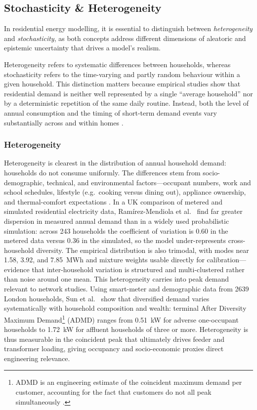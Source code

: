 \subsection{Stochasticity \& Heterogeneity}\label{sec:stochastic_hetero}
In residential energy modelling, it is essential to distinguish between \textit{heterogeneity} and \textit{stochasticity}, as both concepts address different dimensions of aleatoric and epistemic uncertainty that drives a model's realism. 

Heterogeneity refers to systematic differences between households, whereas stochasticity refers to the time-varying and partly random behaviour within a given household. This distinction matters because empirical studies show that residential demand is neither well represented by a single “average household” nor by a deterministic repetition of the same daily routine. Instead, both the level of annual consumption and the timing of short-term demand events vary substantially across and within homes \cite{beis_ofgem_lv_network_capacity_2022}.

\subsubsection*{Heterogeneity}
Heterogeneity is clearest in the distribution of annual household demand: households do not consume uniformly. The differences stem from socio-demographic, technical, and environmental factors—occupant numbers, work and school schedules, lifestyle (e.g.\ cooking versus dining out), appliance ownership, and thermal-comfort expectations \cite{chen_stochastic_2022}.
\newline In a UK comparison of metered and simulated residential electricity data, Ramírez-Mendiola et al.\ \cite{ramirez_mendiola_grunewald_eyre_2017} find far greater dispersion in measured annual demand than in a widely used probabilistic simulation: across 243 households the coefficient of variation is 0.60 in the metered data versus 0.36 in the simulated, so the model under-represents cross-household diversity. The empirical distribution is also trimodal, with modes near 1.58, 3.92, and 7.85~MWh and mixture weights usable directly for calibration—evidence that inter-household variation is structured and multi-clustered rather than noise around one mean.
\newline This heterogeneity carries into peak demand relevant to network studies. Using smart-meter and demographic data from 2639 London households, Sun et al.\ \cite{sun_konstantelos_strbac_2016} show that diversified demand varies systematically with household composition and wealth: terminal After Diversity Maximum Demand\footnote{ADMD is an engineering estimate of the coincident maximum demand per customer, accounting for the fact that customers do not all peak simultaneously \cite{beis_ofgem_lv_network_capacity_2022}.} (ADMD) ranges from 0.51~kW for adverse one-occupant households to 1.72~kW for affluent households of three or more. Heterogeneity is thus measurable in the coincident peak that ultimately drives feeder and transformer loading, giving occupancy and socio-economic proxies direct engineering relevance.

